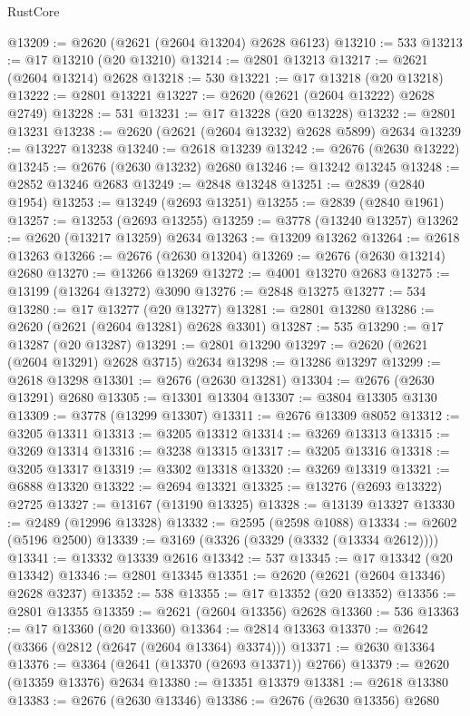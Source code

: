 \begin{lexlean}{RustCore}
\begin{coremodule}
@13209 := @2620 (@2621 (@2604 @13204) @2628 @6123)
@13210 := 533
@13213 := @17 @13210 (@20 @13210)
@13214 := @2801 @13213
@13217 := @2621 (@2604 @13214) @2628
@13218 := 530
@13221 := @17 @13218 (@20 @13218)
@13222 := @2801 @13221
@13227 := @2620 (@2621 (@2604 @13222) @2628 @2749)
@13228 := 531
@13231 := @17 @13228 (@20 @13228)
@13232 := @2801 @13231
@13238 := @2620 (@2621 (@2604 @13232) @2628 @5899) @2634
@13239 := @13227 @13238
@13240 := @2618 @13239
@13242 := @2676 (@2630 @13222)
@13245 := @2676 (@2630 @13232) @2680
@13246 := @13242 @13245
@13248 := @2852 @13246 @2683
@13249 := @2848 @13248
@13251 := @2839 (@2840 @1954)
@13253 := @13249 (@2693 @13251)
@13255 := @2839 (@2840 @1961)
@13257 := @13253 (@2693 @13255)
@13259 := @3778 (@13240 @13257)
@13262 := @2620 (@13217 @13259) @2634
@13263 := @13209 @13262
@13264 := @2618 @13263
@13266 := @2676 (@2630 @13204)
@13269 := @2676 (@2630 @13214) @2680
@13270 := @13266 @13269
@13272 := @4001 @13270 @2683
@13275 := @13199 (@13264 @13272) @3090
@13276 := @2848 @13275
@13277 := 534
@13280 := @17 @13277 (@20 @13277)
@13281 := @2801 @13280
@13286 := @2620 (@2621 (@2604 @13281) @2628 @3301)
@13287 := 535
@13290 := @17 @13287 (@20 @13287)
@13291 := @2801 @13290
@13297 := @2620 (@2621 (@2604 @13291) @2628 @3715) @2634
@13298 := @13286 @13297
@13299 := @2618 @13298
@13301 := @2676 (@2630 @13281)
@13304 := @2676 (@2630 @13291) @2680
@13305 := @13301 @13304
@13307 := @3804 @13305 @3130
@13309 := @3778 (@13299 @13307)
@13311 := @2676 @13309 @8052
@13312 := @3205 @13311
@13313 := @3205 @13312
@13314 := @3269 @13313
@13315 := @3269 @13314
@13316 := @3238 @13315
@13317 := @3205 @13316
@13318 := @3205 @13317
@13319 := @3302 @13318
@13320 := @3269 @13319
@13321 := @6888 @13320
@13322 := @2694 @13321
@13325 := @13276 (@2693 @13322) @2725
@13327 := @13167 (@13190 @13325)
@13328 := @13139 @13327
@13330 := @2489 (@12996 @13328)
@13332 := @2595 (@2598 @1088)
@13334 := @2602 (@5196 @2500)
@13339 := @3169 (@3326 (@3329 (@3332 (@13334 @2612))))
@13341 := @13332 @13339 @2616
@13342 := 537
@13345 := @17 @13342 (@20 @13342)
@13346 := @2801 @13345
@13351 := @2620 (@2621 (@2604 @13346) @2628 @3237)
@13352 := 538
@13355 := @17 @13352 (@20 @13352)
@13356 := @2801 @13355
@13359 := @2621 (@2604 @13356) @2628
@13360 := 536
@13363 := @17 @13360 (@20 @13360)
@13364 := @2814 @13363
@13370 := @2642 (@3366 (@2812 (@2647 (@2604 @13364) @3374)))
@13371 := @2630 @13364
@13376 := @3364 (@2641 (@13370 (@2693 @13371)) @2766)
@13379 := @2620 (@13359 @13376) @2634
@13380 := @13351 @13379
@13381 := @2618 @13380
@13383 := @2676 (@2630 @13346)
@13386 := @2676 (@2630 @13356) @2680

\end{coremodule}
\end{lexlean}

